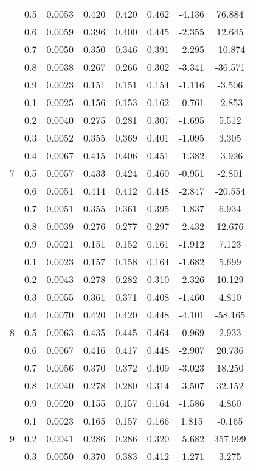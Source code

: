 \documentclass[11pt,a4paper]{report}
\begin{document}
\begin{longtable}{ | c | c || c | c | c | c | c | c | }
 & 0.5 & 0.0053 & 0.420 & 0.420 & 0.462 & -4.136 & 76.884 \\
 & 0.6 & 0.0059 & 0.396 & 0.400 & 0.445 & -2.355 & 12.645 \\
 & 0.7 & 0.0050 & 0.350 & 0.346 & 0.391 & -2.295 & -10.874 \\
 & 0.8 & 0.0038 & 0.267 & 0.266 & 0.302 & -3.341 & -36.571 \\
 & 0.9 & 0.0023 & 0.151 & 0.151 & 0.154 & -1.116 & -3.506 \\
 \hline
\multirow{9}{*}{7} & 0.1 & 0.0025 & 0.156 & 0.153 & 0.162 & -0.761 & -2.853 \\
 & 0.2 & 0.0040 & 0.275 & 0.281 & 0.307 & -1.695 & 5.512 \\
 & 0.3 & 0.0052 & 0.355 & 0.369 & 0.401 & -1.095 & 3.305 \\
 & 0.4 & 0.0067 & 0.415 & 0.406 & 0.451 & -1.382 & -3.926 \\
 & 0.5 & 0.0057 & 0.433 & 0.424 & 0.460 & -0.951 & -2.801 \\
 & 0.6 & 0.0051 & 0.414 & 0.412 & 0.448 & -2.847 & -20.554 \\
 & 0.7 & 0.0051 & 0.355 & 0.361 & 0.395 & -1.837 & 6.934 \\
 & 0.8 & 0.0039 & 0.276 & 0.277 & 0.297 & -2.432 & 12.676 \\
 & 0.9 & 0.0021 & 0.151 & 0.152 & 0.161 & -1.912 & 7.123 \\
 \hline
\multirow{9}{*}{8} & 0.1 & 0.0023 & 0.157 & 0.158 & 0.164 & -1.682 & 5.699 \\
 & 0.2 & 0.0043 & 0.278 & 0.282 & 0.310 & -2.326 & 10.129 \\
 & 0.3 & 0.0055 & 0.361 & 0.371 & 0.408 & -1.460 & 4.810 \\
 & 0.4 & 0.0070 & 0.420 & 0.420 & 0.448 & -4.101 & -58.165 \\
 & 0.5 & 0.0063 & 0.435 & 0.445 & 0.464 & -0.969 & 2.933 \\
 & 0.6 & 0.0067 & 0.416 & 0.417 & 0.448 & -2.907 & 20.736 \\
 & 0.7 & 0.0056 & 0.370 & 0.372 & 0.409 & -3.023 & 18.250 \\
 & 0.8 & 0.0040 & 0.278 & 0.280 & 0.314 & -3.507 & 32.152 \\
 & 0.9 & 0.0020 & 0.155 & 0.157 & 0.164 & -1.586 & 4.860 \\
 \hline
\multirow{9}{*}{9} & 0.1 & 0.0023 & 0.165 & 0.157 & 0.166 & 1.815 & -0.165 \\
 & 0.2 & 0.0041 & 0.286 & 0.286 & 0.320 & -5.682 & 357.999 \\
 & 0.3 & 0.0050 & 0.370 & 0.383 & 0.412 & -1.271 & 3.275 \\

\end{longtable}
\end{document}
